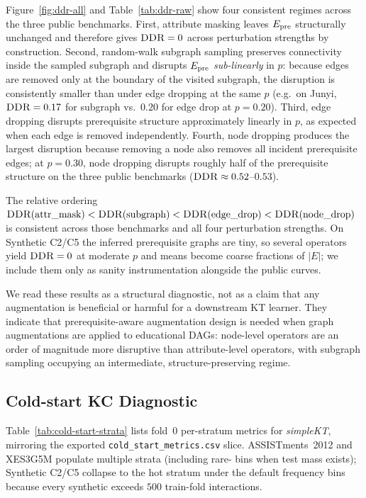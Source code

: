 Figure~\ref{fig:ddr-all} and Table~\ref{tab:ddr-raw} show four
consistent regimes across the three public benchmarks. First, attribute
masking leaves $E_{\text{pre}}$ structurally unchanged and therefore gives
$\textsc{DDR}{}=0$ across perturbation strengths by construction. Second,
random-walk subgraph sampling preserves connectivity inside the
sampled subgraph and disrupts $E_{\text{pre}}$ \emph{sub-linearly} in $p$:
because edges are removed only at the boundary of the visited
subgraph, the disruption is consistently smaller than under
edge dropping at the same $p$ (e.g.\ on Junyi, $\textsc{DDR}{} = 0.17$ for
subgraph vs.\ $0.20$ for edge drop at $p=0.20$). Third, edge dropping
disrupts prerequisite structure approximately linearly in $p$, as
expected when each edge is removed independently. Fourth, node
dropping produces the largest disruption because removing a node also
removes all incident prerequisite edges; at $p = 0.30$, node dropping
disrupts roughly half of the prerequisite structure on the three public
benchmarks ($\textsc{DDR}{} \approx 0.52$--$0.53$).

The relative ordering
$\textsc{DDR}(\text{attr\_mask}) < \textsc{DDR}(\text{subgraph}) <
\textsc{DDR}(\text{edge\_drop}) < \textsc{DDR}(\text{node\_drop})$
is consistent across those benchmarks and all four perturbation
strengths. On Synthetic C2/C5 the inferred prerequisite graphs are tiny, so several operators yield $\textsc{DDR}{}=0$ at moderate $p$ and means become coarse fractions of $|E|$; we include them only as sanity instrumentation alongside the public curves.

We read these results as a structural diagnostic, not as a
claim that any augmentation is beneficial or harmful for a downstream
KT learner. They indicate that prerequisite-aware augmentation design
is needed when graph augmentations are applied to educational DAGs:
node-level operators are an order of magnitude more disruptive than
attribute-level operators, with subgraph sampling occupying an
intermediate, structure-preserving regime.
\subsection{Cold-start KC Diagnostic}
\label{sec:exp-coldstart}

Table~\ref{tab:cold-start-strata} lists fold~0 per-stratum metrics for \textit{simpleKT},
mirroring the exported \texttt{cold\_start\_metrics.csv} slice.
ASSISTments~2012 and XES3G5M populate multiple strata (including rare-\KC{} bins when test mass exists); Synthetic C2/C5 collapse to the hot stratum under the default frequency bins because every synthetic \KC{} exceeds $500$ train-fold interactions.

